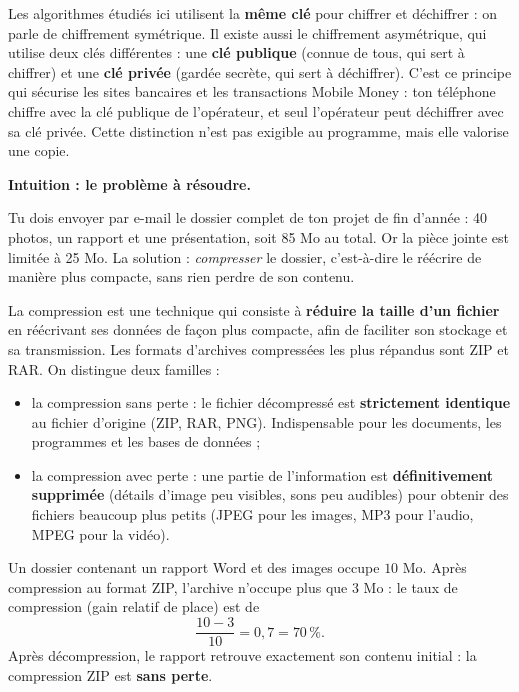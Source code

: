 \documentclass[11pt]{article}
\newcommand{\cle}[1]{{\popxbold\color{popdark}#1}}
\newcounter{popsec}
\newcounter{popsub}
\newcommand{\courssub}[1]{%
  \stepcounter{popsub}%
  \par\vspace{9pt}\noindent{\popxbold\fontsize{11.5}{13}\selectfont\color{popink}{\color{poporange}\thepopsec.\thepopsub}\hspace{6pt}#1}\par\nopagebreak\vspace{4pt}
}
\begin{document}
\begin{savaistu}
Les algorithmes étudiés ici utilisent la \textbf{même clé} pour chiffrer et déchiffrer : on parle de \cle{chiffrement symétrique}. Il existe aussi le \cle{chiffrement asymétrique}, qui utilise deux clés différentes : une \textbf{clé publique} (connue de tous, qui sert à chiffrer) et une \textbf{clé privée} (gardée secrète, qui sert à déchiffrer). C'est ce principe qui sécurise les sites bancaires et les transactions Mobile Money : ton téléphone chiffre avec la clé publique de l'opérateur, et seul l'opérateur peut déchiffrer avec sa clé privée. Cette distinction n'est pas exigible au programme, mais elle valorise une copie.
\end{savaistu}

\courssub{La compression}

\textbf{Intuition : le problème à résoudre.}\par
Tu dois envoyer par e-mail le dossier complet de ton projet de fin d'année : 40 photos, un rapport et une présentation, soit 85 Mo au total. Or la pièce jointe est limitée à 25 Mo. La solution : \emph{compresser} le dossier, c'est-à-dire le réécrire de manière plus compacte, sans rien perdre de son contenu.

\begin{definition}[Compression]
La \cle{compression} est une technique qui consiste à \textbf{réduire la taille d'un fichier} en réécrivant ses données de façon plus compacte, afin de faciliter son stockage et sa transmission. Les formats d'archives compressées les plus répandus sont \cle{ZIP} et \cle{RAR}. On distingue deux familles :
\begin{itemize}
  \item la \cle{compression sans perte} : le fichier décompressé est \textbf{strictement identique} au fichier d'origine (ZIP, RAR, PNG). Indispensable pour les documents, les programmes et les bases de données ;
  \item la \cle{compression avec perte} : une partie de l'information est \textbf{définitivement supprimée} (détails d'image peu visibles, sons peu audibles) pour obtenir des fichiers beaucoup plus petits (\cle{JPEG} pour les images, \cle{MP3} pour l'audio, MPEG pour la vidéo).
\end{itemize}
\end{definition}

\begin{exemplebox}
Un dossier contenant un rapport Word et des images occupe $10$ Mo. Après compression au format ZIP, l'archive n'occupe plus que $3$ Mo : le taux de compression (gain relatif de place) est de
\[ \frac{10 - 3}{10} = 0{,}7 = 70\,\%. \]
Après décompression, le rapport retrouve exactement son contenu initial : la compression ZIP est \textbf{sans perte}.
\end{exemplebox}
\end{document}
